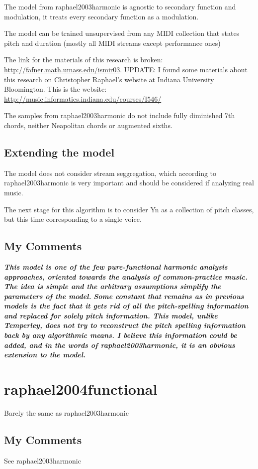 			The model from raphael2003harmonic is agnostic to secondary function and modulation, it treats every secondary function as a modulation.

			The model can be trained unsupervised from any MIDI collection that states pitch and duration (mostly all MIDI streams except performance ones)

			The link for the materials of this research is broken: \url{http://fafner.math.umass.edu/ismir03}. UPDATE: I found some materials about this research on Christopher Raphael's website at Indiana University Bloomington. This is the website: \url{http://music.informatics.indiana.edu/courses/I546/}

			The samples from raphael2003harmonic do not include fully diminished 7th chords, neither Neapolitan chords or augmented sixths.

		\subsection{Extending the model}
			The model does not consider stream seggregation, which according to raphael2003harmonic is very important and should be considered if analyzing real music.

			The next stage for this algorithm is to consider Yn as a collection of pitch classes, but this time corresponding to a single voice.

		\subsection{My Comments}
			\emph{\textbf{
				This model is one of the few pure-functional harmonic analysis approaches, oriented towards the analysis of common-practice music. The idea is simple and the arbitrary assumptions simplify the parameters of the model.
			}}
			\emph{\textbf{
				Some constant that remains as in previous models is the fact that it gets rid of all the pitch-spelling information and replaced for solely pitch information. This model, unlike Temperley, does not try to reconstruct the pitch spelling information back by any algorithmic means. I believe this information could be added, and in the words of raphael2003harmonic, it is an obvious extension to the model.
			}}
	\section{raphael2004functional }
		Barely the same as raphael2003harmonic
		\subsection{My Comments}
			See raphael2003harmonic

